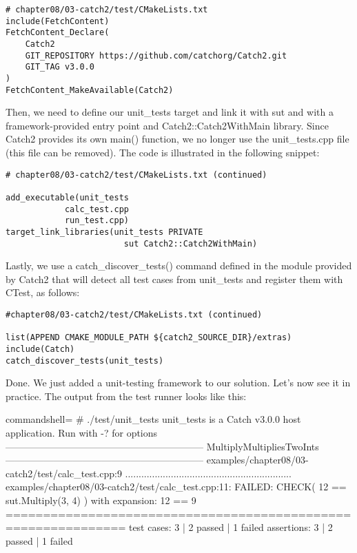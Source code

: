 \begin{lstlisting}[style=styleCMake]
# chapter08/03-catch2/test/CMakeLists.txt
include(FetchContent)
FetchContent_Declare(
	Catch2
	GIT_REPOSITORY https://github.com/catchorg/Catch2.git
	GIT_TAG v3.0.0
)
FetchContent_MakeAvailable(Catch2)
\end{lstlisting} 

Then, we need to define our unit\_tests target and link it with sut and with a framework-provided entry point and Catch2::Catch2WithMain library. Since Catch2 provides its own main() function, we no longer use the unit\_tests.cpp file (this file can be removed). The code is illustrated in the following snippet:

\begin{lstlisting}[style=styleCMake]
# chapter08/03-catch2/test/CMakeLists.txt (continued)

add_executable(unit_tests
			calc_test.cpp
			run_test.cpp)
target_link_libraries(unit_tests PRIVATE
						sut Catch2::Catch2WithMain)
\end{lstlisting} 

Lastly, we use a catch\_discover\_tests() command defined in the module provided by Catch2 that will detect all test cases from unit\_tests and register them with CTest, as follows:

\begin{lstlisting}[style=styleCMake]
#chapter08/03-catch2/test/CMakeLists.txt (continued)

list(APPEND CMAKE_MODULE_PATH ${catch2_SOURCE_DIR}/extras)
include(Catch)
catch_discover_tests(unit_tests)
\end{lstlisting} 

Done. We just added a unit-testing framework to our solution. Let's now see it in practice. The output from the test runner looks like this:

\begin{tcblisting}{commandshell={}}
# ./test/unit_tests
unit_tests is a Catch v3.0.0 host application.
Run with -? for options
--------------------------------------------------------------
MultiplyMultipliesTwoInts
--------------------------------------------------------------
examples/chapter08/03-catch2/test/calc_test.cpp:9
..............................................................
examples/chapter08/03-catch2/test/calc_test.cpp:11: FAILED:
  CHECK( 12 == sut.Multiply(3, 4) )
with expansion:
  12 == 9
==============================================================
test cases: 3 | 2 passed | 1 failed
assertions: 3 | 2 passed | 1 failed
\end{tcblisting}

